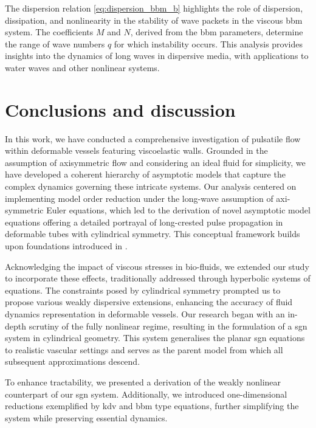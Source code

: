 \documentclass[alpha-refs, 12pt]{wiley-article}
\begin{document}
The dispersion relation \eqref{eq:dispersion_bbm_b} highlights the role of dispersion, dissipation, and nonlinearity in the stability of wave packets in the viscous \acrshort{bbm} system. The coefficients $M$ and $N$, derived from the \acrshort{bbm} parameters, determine the range of wave numbers $q$ for which instability occurs. This analysis provides insights into the dynamics of long waves in dispersive media, with applications to water waves and other nonlinear systems.

\section{Conclusions and discussion}\label{sec:discussion}

In this work, we have conducted a comprehensive investigation of pulsatile flow within deformable vessels featuring viscoelastic walls. Grounded in the assumption of axisymmetric flow and considering an ideal fluid for simplicity, we have developed a coherent hierarchy of asymptotic models that capture the complex dynamics governing these intricate systems. Our analysis centered on implementing model order reduction under the long-wave assumption of axi-symmetric Euler equations, which led to the derivation of novel asymptotic model equations offering a detailed portrayal of long-crested pulse propagation in deformable tubes with cylindrical symmetry. This conceptual framework builds upon foundations introduced in \cite{Mitsotakis2018}.

Acknowledging the impact of viscous stresses in bio-fluids, we extended our study to incorporate these effects, traditionally addressed through hyperbolic systems of equations. The constraints posed by cylindrical symmetry prompted us to propose various weakly dispersive extensions, enhancing the accuracy of fluid dynamics representation in deformable vessels. Our research began with an in-depth scrutiny of the fully nonlinear regime, resulting in the formulation of a \acrfull{sgn} system in cylindrical geometry. This system generalises the planar \acrshort{sgn} equations to realistic vascular settings and serves as the parent model from which all subsequent approximations descend.

To enhance tractability, we presented a derivation of the weakly nonlinear counterpart of our \acrshort{sgn} system. Additionally, we introduced one-dimensional reductions exemplified by \acrfull{kdv} and \acrfull{bbm} type equations, further simplifying the system while preserving essential dynamics.
\end{document}
